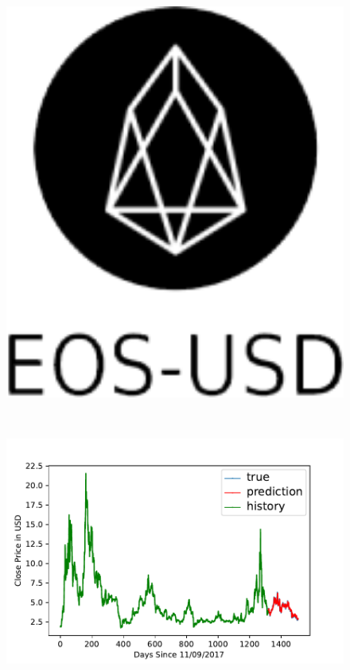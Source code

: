 \begin{figure}[p]
\begin{minipage}{.05\textwidth}
\includegraphics[width=1.0\textwidth]{images/eos-usd.png}
\end{minipage}
\ \
\begin{minipage}{.4\textwidth}
\includegraphics[width=1.0\textwidth]{images/EOS-USD-prediction-model.pdf}

\end{minipage}
\end{figure}
